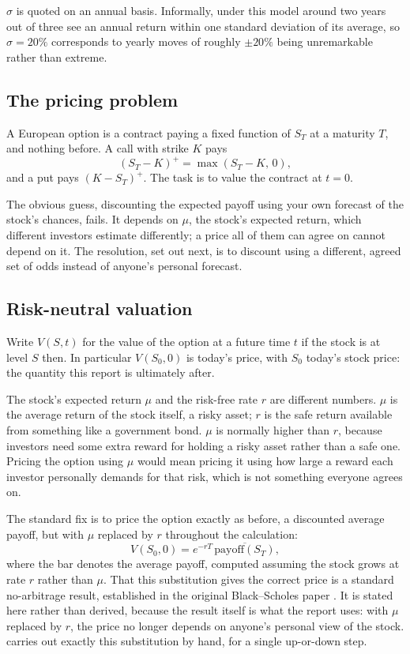 \documentclass[11pt,a4paper]{article}
\numberwithin{equation}{section}
\theoremstyle{definition}
\theoremstyle{plain}
\theoremstyle{remark}
\begin{document}
$\sigma$ is quoted on an annual basis. Informally, under this model around two
years out of three see an annual return within one standard deviation of its
average, so $\sigma = 20\%$ corresponds to yearly moves of roughly $\pm 20\%$
being unremarkable rather than extreme.

\subsection{The pricing problem}

A European option is a contract paying a fixed function of $S_T$ at a maturity
$T$, and nothing before. A call with strike $K$ pays
\[
  (S_T - K)^{+} = \max(S_T - K,\, 0),
\]
and a put pays $(K - S_T)^{+}$. The task is to value the contract at $t = 0$.

The obvious guess, discounting the expected payoff using your own forecast of
the stock's chances, fails. It depends on $\mu$, the stock's expected return,
which different investors estimate differently; a price all of them can agree
on cannot depend on it. The resolution, set out next, is to discount using a
different, agreed set of odds instead of anyone's personal forecast.

\subsection{Risk-neutral valuation}

Write $V(S,t)$ for the value of the option at a future time $t$ if the stock
is at level $S$ then. In particular $V(S_0, 0)$ is today's price, with $S_0$
today's stock price: the quantity this report is ultimately after.

The stock's expected return $\mu$ and the risk-free rate $r$ are different
numbers. $\mu$ is the average return of the stock itself, a risky asset; $r$
is the safe return available from something like a government bond. $\mu$ is
normally higher than $r$, because investors need some extra reward for
holding a risky asset rather than a safe one. Pricing the option using $\mu$
would mean pricing it using how large a reward each investor personally
demands for that risk, which is not something everyone agrees on.

The standard fix is to price the option exactly as before, a discounted
average payoff, but with $\mu$ replaced by $r$ throughout the calculation:
\begin{equation}\label{eq:rn-price}
  V(S_0, 0) = e^{-rT}\,\overline{\mathrm{payoff}(S_T)},
\end{equation}
where the bar denotes the average payoff, computed assuming the stock grows
at rate $r$ rather than $\mu$. That this substitution gives the correct price
is a standard no-arbitrage result, established in the original Black--Scholes
paper \cite{blackscholes}. It is stated here rather than derived,
because the result itself is what the report uses: with $\mu$ replaced by
$r$, the price no longer depends on anyone's personal view of the stock.
 carries out exactly this substitution by hand, for a
single up-or-down step.
\end{document}
